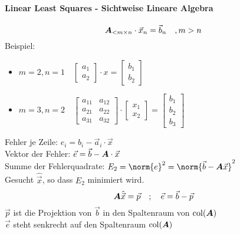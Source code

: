 \paragraph{Linear Least Squares - Sichtweise Lineare Algebra}
\begin{equation}
\boldsymbol {A}_{<m\times n}\cdot\vec{x}_{n} = \vec{b}_{n}\quad,m>n
\end{equation}
Beispiel:
\begin{itemize}
\item $m=2,n=1\quad\begin{bmatrix}
a_1 \\ a_2
\end{bmatrix}\cdot x = \begin{bmatrix}
b_1 \\ b_2
\end{bmatrix}$
\item $m=3,n=2\quad\begin{bmatrix}
a_{11} & a_{12} \\ a_{21} & a_{22} \\ a_{31} & a_{32}
\end{bmatrix}\cdot \begin{bmatrix}
x_1 \\ x_2
\end{bmatrix} = \begin{bmatrix}
b_1 \\ b_2 \\ b_3
\end{bmatrix}$
\end{itemize}

Fehler je Zeile: $e_i = b_i - \vec a_i\cdot \vec x$\\
Vektor der Fehler: $\vec e = \vec b - \boldsymbol {A}\cdot \vec x$\\
Summe der Fehlerquadrate: $E_2 = \norm{e}^2 = \norm{\vec b - \ma A\vec x}^2$\\
Gesucht $\hat{\vec x}$, so dass $E_2$ minimiert wird.
\begin{equation}
\boldsymbol {A}\hat{\vec x} = \vec p \quad ; \quad \vec e = \vec b - \vec p
\end{equation}
$\vec p$ ist die Projektion von $\vec b$ in den Spaltenraum von $\operatorname{col}(\boldsymbol {A})$\\
$\vec e$ steht senkrecht auf den Spaltenraum $\operatorname{col}(\boldsymbol {A})$